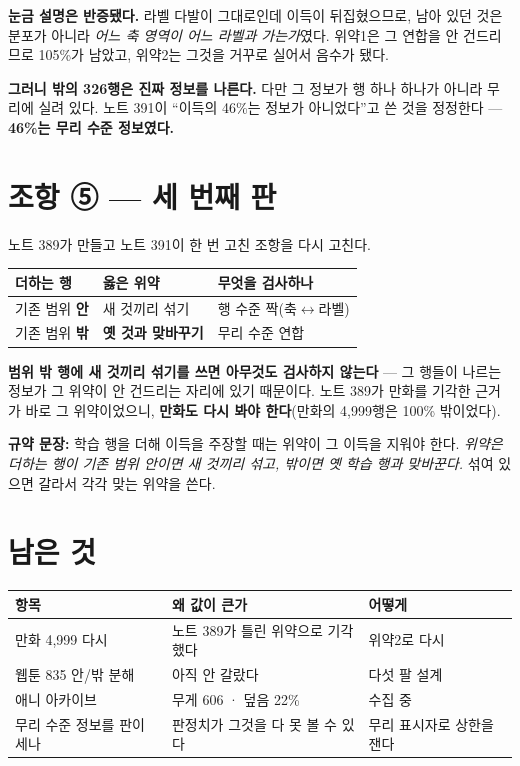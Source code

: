 \documentclass[11pt]{article}
\begin{document}
\textbf{눈금 설명은 반증됐다.} 라벨 다발이 그대로인데 이득이 뒤집혔으므로,
남아 있던 것은 분포가 아니라 \emph{어느 축 영역이 어느 라벨과 가는가}였다.
위약1은 그 연합을 안 건드리므로 105\%가 남았고, 위약2는 그것을 거꾸로
실어서 음수가 됐다.

\textbf{그러니 밖의 326행은 진짜 정보를 나른다.} 다만 그 정보가 행 하나
하나가 아니라 무리에 실려 있다. 노트 391이 ``이득의 46\%는 정보가
아니었다''고 쓴 것을 정정한다 --- \textbf{46\%는 무리 수준 정보였다.}

\section{조항 ⑤ --- 세 번째 판}

노트 389가 만들고 노트 391이 한 번 고친 조항을 다시 고친다.

\begin{center}
\begin{tabular}{lll}
\hline
더하는 행 & 옳은 위약 & 무엇을 검사하나 \\
\hline
기존 범위 \textbf{안} & 새 것끼리 섞기 & 행 수준 짝(축$\leftrightarrow$라벨) \\
기존 범위 \textbf{밖} & \textbf{옛 것과 맞바꾸기} & 무리 수준 연합 \\
\hline
\end{tabular}
\end{center}

\textbf{범위 밖 행에 새 것끼리 섞기를 쓰면 아무것도 검사하지 않는다} ---
그 행들이 나르는 정보가 그 위약이 안 건드리는 자리에 있기 때문이다. 노트
389가 만화를 기각한 근거가 바로 그 위약이었으니, \textbf{만화도 다시
봐야 한다}(만화의 4,999행은 100\% 밖이었다).

\textbf{규약 문장:} 학습 행을 더해 이득을 주장할 때는 위약이 그 이득을
지워야 한다. \emph{위약은 더하는 행이 기존 범위 안이면 새 것끼리 섞고,
밖이면 옛 학습 행과 맞바꾼다.} 섞여 있으면 갈라서 각각 맞는 위약을 쓴다.

\section{남은 것}

\begin{center}
\begin{tabular}{lll}
\hline
항목 & 왜 값이 큰가 & 어떻게 \\
\hline
만화 4,999 다시 & 노트 389가 틀린 위약으로 기각했다 & 위약2로 다시 \\
웹툰 835 안/밖 분해 & 아직 안 갈랐다 & 다섯 팔 설계 \\
애니 아카이브 & 무게 606 · 덮음 22\% & 수집 중 \\
무리 수준 정보를 판이 세나 & 판정치가 그것을 다 못 볼 수 있다 & 무리 표시자로 상한을 잰다 \\
\hline
\end{tabular}
\end{center}
\end{document}
